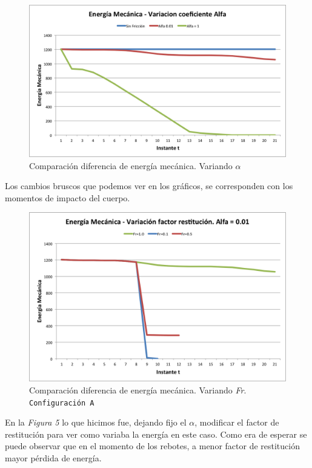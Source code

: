 \documentclass[a4paper]{article}
\begin{document}
\begin{figure}[H]
  \centering
  \includegraphics[scale=0.75]{graficos/4-energiaMecanica-alpha.png}
  \caption{Comparación diferencia de energía mecánica. Variando $\alpha$ }
\end{figure}

Los cambios bruscos que podemos ver en los gráficos, se corresponden con los momentos de impacto del cuerpo.

\begin{figure}[H]
  \centering
  \includegraphics[scale=0.75]{graficos/5-energiaMecanica-fr.png}
  \caption{Comparación diferencia de energía mecánica. Variando \textit{Fr}. \texttt{Configuración A} }
\end{figure}
 	
En la \textit{Figura 5} lo que hicimos fue, dejando fijo el $\alpha$, modificar el factor de restitución para ver como variaba la energía en este caso. Como era de esperar se puede observar que en el momento de los rebotes, a menor factor de restitución mayor pérdida de energía.\\[1em]
\end{document}
